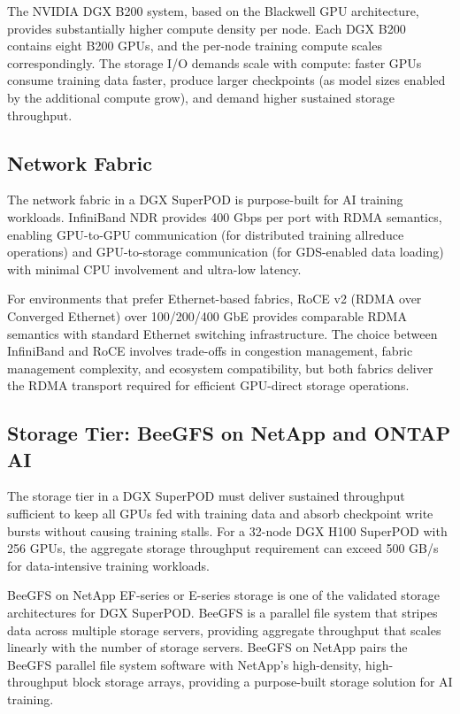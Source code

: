 The NVIDIA DGX B200 system, based on the Blackwell GPU architecture, provides substantially higher compute density per node. Each DGX B200 contains eight B200 GPUs, and the per-node training compute scales correspondingly. The storage I/O demands scale with compute: faster GPUs consume training data faster, produce larger checkpoints (as model sizes enabled by the additional compute grow), and demand higher sustained storage throughput.

\subsection{Network Fabric}

The network fabric in a DGX SuperPOD is purpose-built for AI training workloads. InfiniBand NDR provides 400 Gbps per port with RDMA semantics, enabling GPU-to-GPU communication (for distributed training allreduce operations) and GPU-to-storage communication (for GDS-enabled data loading) with minimal CPU involvement and ultra-low latency.

For environments that prefer Ethernet-based fabrics, RoCE v2 (RDMA over Converged Ethernet) over 100/200/400 GbE provides comparable RDMA semantics with standard Ethernet switching infrastructure. The choice between InfiniBand and RoCE involves trade-offs in congestion management, fabric management complexity, and ecosystem compatibility, but both fabrics deliver the RDMA transport required for efficient GPU-direct storage operations.

\subsection{Storage Tier: BeeGFS on NetApp and ONTAP AI}

The storage tier in a DGX SuperPOD must deliver sustained throughput sufficient to keep all GPUs fed with training data and absorb checkpoint write bursts without causing training stalls. For a 32-node DGX H100 SuperPOD with 256 GPUs, the aggregate storage throughput requirement can exceed 500 GB/s for data-intensive training workloads.

BeeGFS on NetApp EF-series or E-series storage is one of the validated storage architectures for DGX SuperPOD. BeeGFS is a parallel file system that stripes data across multiple storage servers, providing aggregate throughput that scales linearly with the number of storage servers. BeeGFS on NetApp pairs the BeeGFS parallel file system software with NetApp's high-density, high-throughput block storage arrays, providing a purpose-built storage solution for AI training.

